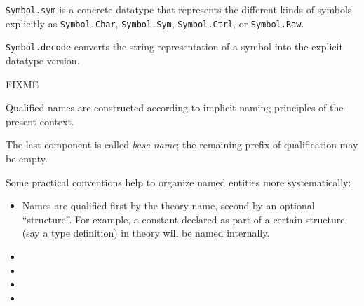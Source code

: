\begin{isabellebody}
\begin{isamarkuptext}
\begin{description}
  \item \verb|Symbol.sym| is a concrete datatype that represents
  the different kinds of symbols explicitly as \verb|Symbol.Char|,
  \verb|Symbol.Sym|, \verb|Symbol.Ctrl|, or \verb|Symbol.Raw|.

  \item \verb|Symbol.decode| converts the string representation of a
  symbol into the explicit datatype version.

  \end{description}%
\end{isamarkuptext}%
\isamarkuptrue%
%
\endisatagmlref
{\isafoldmlref}%
%
\isadelimmlref
%
\endisadelimmlref
%
\isamarkuptrue%
%
\begin{isamarkuptext}%
FIXME%
\end{isamarkuptext}%
\isamarkuptrue%
%
\isamarkuptrue%
%
\isadelimFIXME
%
\endisadelimFIXME
%
\isatagFIXME
%
\begin{isamarkuptext}%
Qualified names are constructed according to implicit naming
principles of the present context.


The last component is called \emph{base name}; the remaining prefix of
qualification may be empty.

Some practical conventions help to organize named entities more
systematically:

\begin{itemize}

\item Names are qualified first by the theory name, second by an
optional ``structure''.  For example, a constant  declared
as part of a certain structure  (say a type definition) in
theory  will be named  internally.

\item

\item

\item

\item

\end{itemize}


\end{isamarkuptext}
\end{isabellebody}

